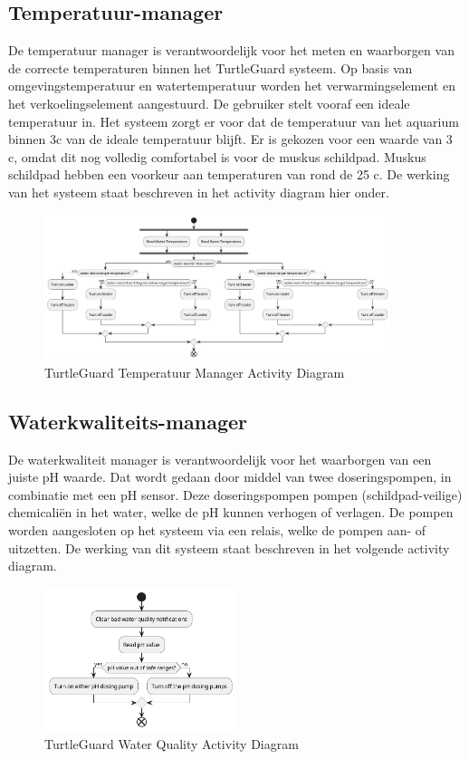 \documentclass[a4paper]{report}
\newcommand{\turtleguard}{\mbox{TurtleGuard\texttrademark}\xspace}
\begin{document}
\subsection{Temperatuur-manager}
\label{sec:tempmgr}
De temperatuur manager is verantwoordelijk voor het meten en waarborgen van de correcte temperaturen binnen het \turtleguard systeem.
Op basis van omgevingstemperatuur en watertemperatuur worden het verwarmingselement en het verkoelingselement aangestuurd.
De gebruiker stelt vooraf een ideale temperatuur in. Het systeem zorgt er voor dat de temperatuur van het aquarium binnen 3\textdegree c van de ideale temperatuur blijft.
Er is gekozen voor een waarde van 3 \textdegree c, omdat dit nog volledig comfortabel is voor de muskus schildpad. Muskus schildpad hebben een voorkeur aan temperaturen van rond de 25 \textdegree c\cite{picard2011common}.
De werking van het systeem staat beschreven in het activity diagram hier onder.

\begin{figure}[H]
  \centering
  \includegraphics[width=0.9\textwidth]{Images/ActivityDiagramTemp.png}
  \caption{\turtleguard Temperatuur Manager Activity Diagram}
  \label{fig:activitydiagramtemperature}
\end{figure}

\subsection{Waterkwaliteits-manager}
\label{sec:wqmgr}
De waterkwaliteit manager is verantwoordelijk voor het waarborgen van een juiste pH waarde. 
Dat wordt gedaan door middel van twee doseringspompen, in combinatie met een pH sensor.
Deze doseringspompen pompen (schildpad-veilige) chemicaliën in het water, welke de pH kunnen verhogen of verlagen.
De pompen worden aangesloten op het systeem via een relais, welke de pompen aan- of uitzetten.
De werking van dit systeem staat beschreven in het volgende activity diagram. 
\begin{figure}[H]
  \centering
  \includegraphics[width=0.5\textwidth]{Images/ActivityDiagramQuality.png}
  \caption{\turtleguard Water Quality Activity Diagram}
  \label{fig:activitydiagramquality}
\end{figure}
\end{document}
